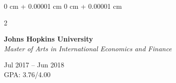 \documentclass[10pt, letterpaper]{article}
\newenvironment{highlights}{
    \begin{itemize}[
        topsep=0.04 cm,
        parsep=0.02cm,
        partopsep=0pt,
        itemsep=0pt,
        leftmargin=0 cm + 10pt
    ]
}{
    \end{itemize}
} %
\newenvironment{onecolentry}{
    \begin{adjustwidth}{
        0 cm + 0.00001 cm
    }{
        0 cm + 0.00001 cm
    }
}{
    \end{adjustwidth}
} %
\newenvironment{twocolentry}[2][]{
    \onecolentry
    \def\secondColumn{#2}
    \setcolumnwidth{\fill, 3.8 cm}
    \begin{paracol}{2}
}{
    \switchcolumn \raggedleft \secondColumn
    \end{paracol}
    \endonecolentry
} %
\begin{document}
        \vspace{0.2 cm}
        
        \begin{twocolentry}{Jul 2017 – Jun 2018 \\ GPA: 3.76/4.00}
            \textbf{Johns Hopkins University} \\
            \textit{Master of Arts in International Economics and Finance}
        \end{twocolentry}
        
        

        \vspace{0.2 cm}
    

    
\end{document}
